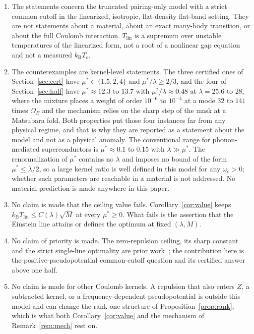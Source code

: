 \documentclass[11pt]{article}
\newcommand{\kb}{k_{\mathrm B}}
\newcommand{\Tlin}{T_{\mathrm{lin}}}
\newcommand{\OmE}{\Omega_E}
\newcommand{\muS}{\mu^{*}}
\theoremstyle{definition}
\theoremstyle{remark}
\begin{document}
\begin{enumerate}[label=(\arabic*),leftmargin=2.2em]
\item The statements concern the truncated pairing-only model with a strict common cutoff
in the linearized, isotropic, flat-density flat-band setting. They are not statements
about a material, about an exact many-body transition, or about the full Coulomb
interaction. $\Tlin$ is a supremum over unstable temperatures of the linearized form, not
a root of a nonlinear gap equation and not a measured $\kb T_c$.
\item The counterexamples are kernel-level statements. The three certified ones of
Section~\ref{sec:cert} have $\muS\in\{1.5,2,4\}$ and $\muS/\lambda\ge2/3$, and the four of
Section~\ref{sec:half} have $\muS\approx12.3$ to $13.7$ with $\muS/\lambda\approx0.48$ at
$\lambda=25.6$ to $28$, where the mixture places a weight of order $10^{-6}$ to $10^{-4}$
at a mode $32$ to $141$ times $\OmE$ and the mechanism relies on the sharp step of the
mask at a Matsubara fold. Both properties put those four instances far from any physical
regime, and that is why they are reported as a statement about the model and not as a
physical anomaly. The conventional range for
phonon-mediated superconductors is $\muS\approx0.1$ to $0.15$ with $\lambda\gg\muS$. The
renormalization of $\muS$ contains no $\lambda$ and imposes no bound of the form
$\muS\le\lambda/2$, so a large kernel ratio is well defined in this model for any
$\omega_c>0$; whether such parameters are reachable in a material is not addressed. No
material prediction is made anywhere in this paper.
\item No claim is made that the ceiling value fails. Corollary~\ref{cor:value} keeps
$\kb\Tlin\le C(\lambda)\sqrt M$ at every $\muS\ge0$. What fails is the assertion that the
Einstein line attains or defines the optimum at fixed $(\lambda,M)$.
\item No claim of priority is made. The zero-repulsion ceiling, its sharp constant and the
strict single-line optimality are prior work~\cite{rens,kondratev,finiteband,gamma}; the
contribution here is the positive-pseudopotential common-cutoff question and its
certified answer above one half.
\item No claim is made for other Coulomb kernels. A repulsion that also enters $Z$, a
subtracted kernel, or a frequency-dependent pseudopotential is outside this model and can
change the rank-one structure of Proposition~\ref{prop:rank}, which is what both
Corollary~\ref{cor:value} and the mechanism of Remark~\ref{rem:mech} rest on.

\end{enumerate}
\end{document}
